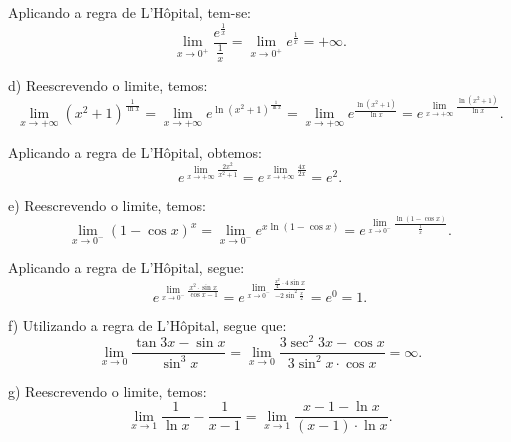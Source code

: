\documentclass{article}
\begin{document}
{\begin{newpage}
\par Aplicando a regra de L'Hôpital, tem-se:
\begin{equation*} \displaystyle{\lim_{x\to 0^{+}} \frac{e^{\frac{1}{x}}}{\frac{1}{x}} = \lim_{x\to 0^{+}} e^{\frac{1}{x}} = +\infty }.\end{equation*}
\par
\vspace{0.3cm}
d)  Reescrevendo o limite, temos:
\begin{equation*} \displaystyle{\lim_{x\to +\infty } (x^2 + 1)^{\frac{1}{\ln{x}}} = \lim_{x\to +\infty } e^{\ln{(x^2 + 1)^{\frac{1}{\ln{x}}}}} = \lim_{x\to +\infty } e^{\frac{\ln{(x^2 + 1)}}{\ln{x}}} = e^{\lim_{x\to +\infty } \frac{\ln{(x^2 + 1)}}{\ln{x}}}}.\end{equation*}
\par Aplicando a regra de L'Hôpital, obtemos:
\begin{equation*} \displaystyle{e^{\lim_{x\to +\infty } \frac{2x^2}{x^2 + 1}} = e^{\lim_{x\to +\infty } \frac{4x}{2x}} = e^2 }.\end{equation*}
\par
\vspace{0.3cm}
e) Reescrevendo o limite, temos:
\begin{equation*} \displaystyle{\lim_{x\to 0^{-}} (1 - \cos{x})^{x} = \lim_{x\to 0^{-}} e^{x\ln{(1 - \cos{x})}} = e^{\lim_{x\to 0^{-}} \frac{\ln{(1-\cos{x})}}{\frac{1}{x}}}}.\end{equation*}
\par Aplicando a regra de L'Hôpital, segue:
\begin{equation*} \displaystyle{e^{\lim_{x\to 0^{-}} \frac{x^{2}\cdot\sin{x}}{\cos{x} - 1}} = e^{\lim_{x\to 0^{-}} \frac{\frac{x^2}{4}\cdot 4\sin{x}}{-2\sin^{2}{\frac{x}{2}}}} = e^{0} =1.} \end{equation*}
\par
\vspace{0.3cm}
f) Utilizando a regra de L'Hôpital, segue que:
\begin{equation*} \displaystyle{\lim_{x\to 0} \frac{\tan{3x} - \sin{x}}{\sin^{3}{x}} = \lim_{x\to 0} \frac{3\sec^{2}{3x} - \cos{x}}{3\sin^{2}{x}\cdot\cos{x}} = \infty }.\end{equation*}
\par
\vspace{0.3cm}
g) Reescrevendo o limite, temos:
\begin{equation*} \displaystyle{\lim_{x\to 1} \frac{1}{\ln{x}} - \frac{1}{x-1} = \lim_{x\to 1} \frac{x-1-\ln{x}}{(x-1)\cdot\ln{x}}}.\end{equation*}

\end{newpage}}
\end{document}
